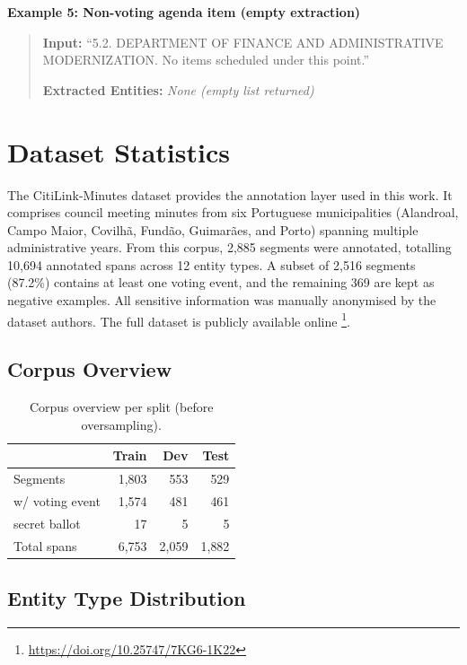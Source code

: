 \documentclass[11pt]{article}
\begin{document}
\noindent\textbf{Example 5: Non-voting agenda item (empty extraction)}
\begin{quote}
\small
\textbf{Input:} ``5.2. DEPARTMENT OF FINANCE AND ADMINISTRATIVE MODERNIZATION. No items scheduled under this point.''

\textbf{Extracted Entities:} \textit{None (empty list returned)}
\end{quote}


\section{Dataset Statistics}
\label{app:dataset}

The CitiLink-Minutes dataset \citep{CitiLinkMinutes2026} provides the annotation layer used in this work. It comprises council meeting minutes from six Portuguese municipalities (Alandroal, Campo Maior, Covilhã, Fundão, Guimarães, and Porto) spanning multiple administrative years. From this corpus, 2{,}885 segments were annotated, totalling 10{,}694 annotated spans across 12 entity types. A subset of 2{,}516 segments (87.2\%) contains at least one voting event, and the remaining 369 are kept as negative examples. All sensitive information was manually anonymised by the dataset authors. The full dataset is publicly available online \footnote{\url{https://doi.org/10.25747/7KG6-1K22}}. 


\subsection{Corpus Overview}
\label{app:dataset:overview}

\begin{table}[h]
\centering
\small
\begin{tabular}{lrrr}
\toprule
 & \textbf{Train} & \textbf{Dev} & \textbf{Test} \\
\midrule
Segments              & 1{,}803 & 553 & 529 \\
\quad w/ voting event & 1{,}574 & 481 & 461 \\
\quad secret ballot   &      17 &   5 &   5 \\
Total spans           & 6{,}753 & 2{,}059 & 1{,}882 \\
\bottomrule
\end{tabular}
\caption{Corpus overview per split (before oversampling).}
\label{tab:corpus-overview}
\end{table}

\subsection{Entity Type Distribution}
\label{app:dataset:entities}
\end{document}
